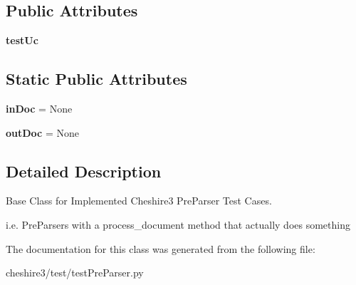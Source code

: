 \subsection*{Public Attributes}
\begin{DoxyCompactItemize}
\item 
\hypertarget{classcheshire3_1_1test_1_1test_pre_parser_1_1_implemented_pre_parser_test_case_ad5ce1008ef2cbad2a971fbbe4ac7d05c}{{\bfseries test\-Uc}}\label{classcheshire3_1_1test_1_1test_pre_parser_1_1_implemented_pre_parser_test_case_ad5ce1008ef2cbad2a971fbbe4ac7d05c}

\end{DoxyCompactItemize}
\subsection*{Static Public Attributes}
\begin{DoxyCompactItemize}
\item 
\hypertarget{classcheshire3_1_1test_1_1test_pre_parser_1_1_implemented_pre_parser_test_case_ab7be799e2b67b2e743737853586b6b6c}{{\bfseries in\-Doc} = None}\label{classcheshire3_1_1test_1_1test_pre_parser_1_1_implemented_pre_parser_test_case_ab7be799e2b67b2e743737853586b6b6c}

\item 
\hypertarget{classcheshire3_1_1test_1_1test_pre_parser_1_1_implemented_pre_parser_test_case_ade50e153fa7fb0742173ce9cbc886d24}{{\bfseries out\-Doc} = None}\label{classcheshire3_1_1test_1_1test_pre_parser_1_1_implemented_pre_parser_test_case_ade50e153fa7fb0742173ce9cbc886d24}

\end{DoxyCompactItemize}


\subsection{Detailed Description}
\begin{DoxyVerb}Base Class for Implemented Cheshire3 PreParser Test Cases.

i.e. PreParsers with a process_document method that actually does 
something
\end{DoxyVerb}
 

The documentation for this class was generated from the following file\-:\begin{DoxyCompactItemize}
\item 
cheshire3/test/test\-Pre\-Parser.\-py\end{DoxyCompactItemize}
